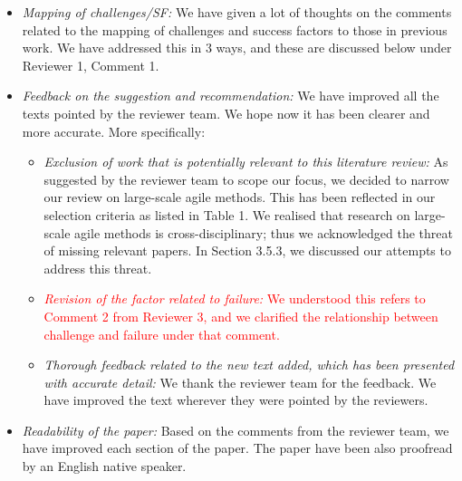 \documentclass[a4paper,twoside,11pt]{reviewresponse}
\begin{document}
\begin{itemize}
	\item \textit{Mapping of challenges/SF:} We have given a lot of thoughts on the comments related to the mapping of challenges and success factors to those in previous work. We have addressed this in 3 ways, and these are discussed below under Reviewer 1, Comment 1.
	\item \textit{Feedback on the suggestion and recommendation:} We have improved all the texts pointed by the reviewer team. We hope now it has been clearer and more accurate. More specifically:
		\begin{itemize}
			\item \textit{Exclusion of work that is potentially relevant to this literature review:} As suggested by the reviewer team to scope our focus, we decided to narrow our review on large-scale agile methods. This has been reflected in our selection criteria as listed in Table 1. We realised that research on large-scale agile methods is cross-disciplinary; thus we acknowledged the threat of missing relevant papers. In Section 3.5.3, we discussed our attempts to address this threat.
			\item \textcolor{red}{\textit{Revision of the factor related to failure:} We understood this refers to Comment 2 from Reviewer 3, and we clarified the relationship between challenge and failure under that comment.}
			\item \textit{Thorough feedback related to the new text added, which has been presented with accurate detail:} We thank the reviewer team for the feedback. We have improved the text wherever they were pointed by the reviewers.
		\end{itemize}	
	\item \textit{Readability of the paper:} Based on the comments from the reviewer team, we have improved
each section of the paper. The paper have been also proofread by an English native speaker.
\end{itemize}

\clearpage
\end{document}
